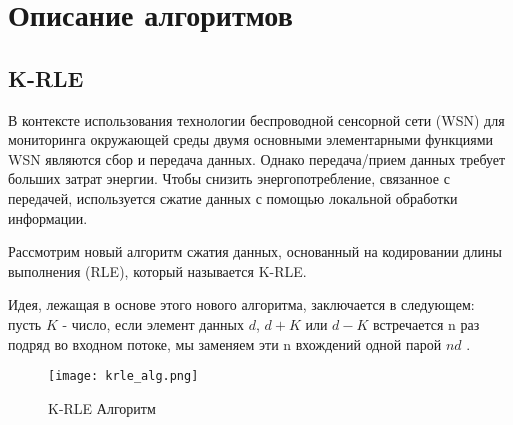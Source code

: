 \chapter{Описание алгоритмов}
\label{ch:chap1}

\section{K-RLE}

В контексте использования технологии беспроводной сенсорной сети
(WSN) для мониторинга окружающей среды двумя
основными элементарными функциями WSN являются сбор
и передача данных. Однако передача/прием данных
требует больших затрат энергии. Чтобы снизить энергопотребление, связанное с передачей, используется сжатие данных с помощью локальной обработки информации.

Рассмотрим новый алгоритм сжатия данных, основанный на кодировании длины выполнения (RLE), который называется K-RLE.

Идея, лежащая в основе этого нового алгоритма, заключается в следующем:
пусть $K$ - число, если элемент данных $d$, $d+K$ или $d-K$ встречается n раз подряд во входном потоке, мы заменяем эти n вхождений
одной парой $nd$ \cite{krle_article}.

\begin{figure}[ht]
    \centering
    \texttt{[image: krle\_alg.png]}
    \caption{K-RLE Алгоритм}
    \label{fig:krle_alg}
\end{figure}

\endinput